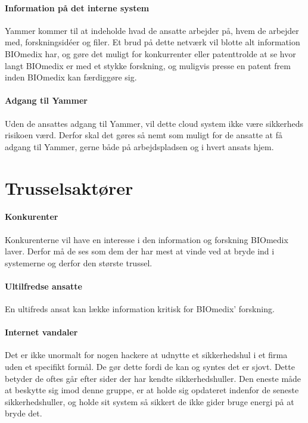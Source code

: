 \documentclass{article}
\begin{document}
\paragraph{Information på det interne system}
Yammer kommer til at indeholde hvad de ansatte arbejder på, hvem de arbejder med, forskningsidéer og filer. Et brud på dette netværk vil blotte alt information BIOmedix har, og gøre det muligt for konkurrenter eller patenttrolde at se hvor langt BIOmedix er med et stykke forskning, og muligvis presse en patent frem inden BIOmedix kan færdiggøre sig. 

\paragraph{Adgang til Yammer}
Uden de ansattes adgang til Yammer, vil dette cloud system ikke være sikkerheds risikoen værd. Derfor skal det gøres så nemt som muligt for de ansatte at få adgang til Yammer, gerne både på arbejdspladsen og i hvert ansats hjem.  


\section{Trusselsaktører}


\paragraph{Konkurenter}
Konkurenterne vil have en interesse i den information og forskning BIOmedix laver.
Derfor må de ses som dem der har mest at vinde ved at bryde ind i systemerne og derfor
den største trussel.

\paragraph{Ultilfredse ansatte}
En ultifreds ansat kan lække information kritisk for BIOmedix' forskning.




\paragraph{Internet vandaler}
Det er ikke unormalt for nogen hackere at udnytte et sikkerhedshul i et firma
uden et specifikt formål. De gør dette fordi de kan og syntes det er sjovt. Dette
betyder de oftes går efter sider der har kendte sikkerhedshuller.
Den eneste måde at beskytte sig imod denne gruppe, er at holde sig opdateret indenfor de
seneste sikkerhedshuller, og holde sit system så sikkert de ikke gider bruge
energi på at bryde det.
\end{document}
